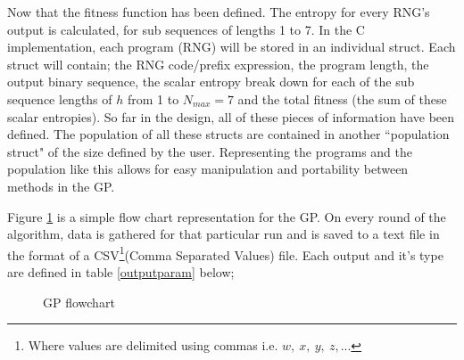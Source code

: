 \documentclass[a4paper,10.5pt]{article}
\begin{document}
Now that the fitness function has been defined. The entropy for every RNG's output is calculated, for sub sequences of lengths 1 to 7.
In the C implementation, each program (RNG) will be stored in an individual struct. Each struct will contain; the RNG code/prefix expression, the program length, the output binary sequence, the scalar entropy break down for each of the sub sequence lengths of $h$ from 1 to $N_{max} = 7$ and the total fitness (the sum of these scalar entropies). So far in the design, all of these pieces of information have been defined. The population of all these structs are contained in another ``population struct" of the size defined by the user. Representing the programs and the population like this allows for easy manipulation and portability between methods in the GP.

Figure \ref{simpleflow} is a simple flow chart representation for the GP. On every round of the algorithm, data is gathered for that particular run and is saved to a text file in the format of a CSV\footnote{Where values are delimited using commas i.e. $w,\ x,\ y,\ z, ...$}(Comma Separated Values) file. Each output and it's type are defined in table \ref{outputparam} below;
\newpage
\begin{figure}
\caption{GP flowchart}
\label{simpleflow}
\end{figure}
\end{document}
